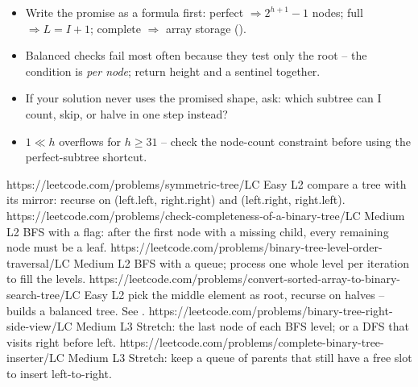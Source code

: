 \begin{stuckbox}
\begin{itemize}[nosep, leftmargin=1.4em]
  \item Write the promise as a formula first: perfect $\Rightarrow 2^{h+1}-1$ nodes;
        full $\Rightarrow L = I+1$; complete $\Rightarrow$ array storage ().
  \item Balanced checks fail most often because they test only the root -- the condition
        is \emph{per node}; return height and a sentinel together.
  \item If your solution never uses the promised shape, ask: which subtree can I count,
        skip, or halve in one step instead?
  \item $1 \ll h$ overflows for $h \ge 31$ -- check the node-count constraint before
        using the perfect-subtree shortcut.
\end{itemize}
\end{stuckbox}

\begin{practiceset}
    {https://leetcode.com/problems/symmetric-tree/}{LC Easy L2}
    {compare a tree with its mirror: recurse on (left.left, right.right) and (left.right, right.left).}
    {https://leetcode.com/problems/check-completeness-of-a-binary-tree/}{LC Medium L2}
    {BFS with a flag: after the first node with a missing child, every remaining node must be a leaf.}
    {https://leetcode.com/problems/binary-tree-level-order-traversal/}{LC Medium L2}
    {BFS with a queue; process one whole level per iteration to fill the levels.}
    {https://leetcode.com/problems/convert-sorted-array-to-binary-search-tree/}{LC Easy L2}
    {pick the middle element as root, recurse on halves -- builds a balanced tree. See .}
    {https://leetcode.com/problems/binary-tree-right-side-view/}{LC Medium L3}
    {Stretch: the last node of each BFS level; or a DFS that visits right before left.}
    {https://leetcode.com/problems/complete-binary-tree-inserter/}{LC Medium L3}
    {Stretch: keep a queue of parents that still have a free slot to insert left-to-right.}
\end{practiceset}


